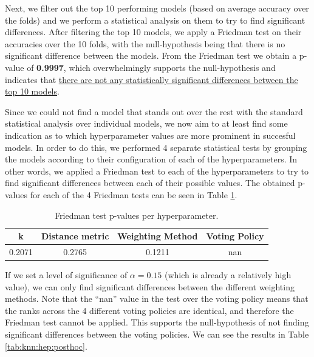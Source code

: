Next, we filter out the top 10 performing models (based on average accuracy over the folds) and we perform a statistical analysis on them to try to find significant differences. After filtering the top 10 models, we apply a Friedman test on their accuracies over the 10 folds, with the null-hypothesis being that there is no significant difference between the models. From the Friedman test we obtain a p-value of \textbf{0.9997}, which overwhelmingly supports the null-hypothesis and indicates that \uline{there are not any statistically significant differences between the top 10 models}.

Since we could not find a model that stands out over the rest with the standard statistical analysis over individual models, we now aim to at least find some indication as to which hyperparameter values are more prominent in succesful models. In order to do this, we performed 4 separate statistical tests by grouping the models according to their configuration of each of the hyperparameters. In other words, we applied a Friedman test to each of the hyperparameters to try to find significant differences between each of their possible values. The obtained p-values for each of the 4 Friedman tests can be seen in Table \ref{tab:knn:hep:hyperparam}.
\begin{table}[h]
    \centering
    \small
    \begin{tabular}{|c|c|c|c|}
        \hline
        \textbf{k} & \textbf{Distance metric} & \textbf{Weighting Method} & \textbf{Voting Policy} \\ \hline
        0.2071 & 0.2765 & 0.1211 & nan \\ \hline
    \end{tabular}
    \caption{Friedman test p-values per hyperparameter.}
    \label{tab:knn:hep:hyperparam}
\end{table}

If we set a level of significance of $ \alpha = 0.15 $ (which is already a relatively high value), we can only find significant differences between the different weighting methods. Note that the ``nan'' value in the test over the voting policy means that the ranks across the 4 different voting policies are identical, and therefore the Friedman test cannot be applied. This supports the null-hypothesis of not finding significant differences between the voting policies. We can see the results in Table \ref{tab:knn:hep:posthoc}.

